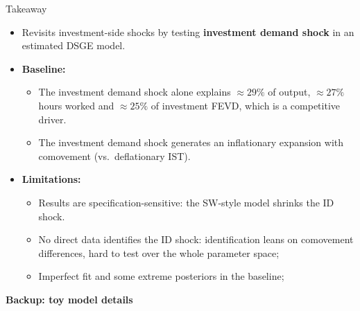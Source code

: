 \documentclass[9pt]{beamer}
\begin{document}
\begin{frame}{Takeaway}
	\begin{itemize}
		\item Revisits investment-side shocks by testing \textbf{investment demand shock} in an estimated DSGE model.
		\item \textbf{Baseline:} 
		\begin{itemize}
			\item The investment demand shock alone explains $\approx 29\%$ of output, $\approx 27\%$ hours worked and $\approx 25\%$ of investment FEVD, which is a competitive driver.
			\item The investment demand shock generates an inflationary expansion with comovement (vs.\ deflationary IST).
		\end{itemize}
		\item \textbf{Limitations:}
		\begin{itemize}
			\item Results are specification-sensitive: the SW-style model shrinks the ID shock.
			\item No direct data identifies the ID shock: identification leans on comovement differences, hard to test over the whole parameter space;
			\item Imperfect fit and some extreme posteriors in the baseline;
		\end{itemize}
	\end{itemize}
\end{frame}

\appendix
\begin{frame}[c]{}
	\centering
	{\Large\textbf{Backup: toy model details}}
\end{frame}
\end{document}
